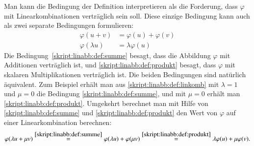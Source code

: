 Man kann die Bedingung der Definition interpretieren als die Forderung,
dass $\varphi$ mit Linearkombinationen verträglich sein soll.
Diese einzige Bedingung kann auch als zwei separate Bedingungen
formulieren:
\begin{align}
\varphi(u+v)&=\varphi(u)+\varphi(v)
\label{skript:linabb:def:summe}
\\
\varphi(\lambda u)&=\lambda \varphi(u)
\label{skript:linabb:def:produkt}
\end{align}
Die Bedingung~\eqref{skript:linabb:def:summe} besagt, dass die Abbildung
$\varphi$ mit Additionen verträglich ist, und 
\eqref{skript:linabb:def:produkt} besagt, dass $\varphi$ mit skalaren
Multiplikationen verträglich ist.
Die beiden Bedingungen sind natürlich äquivalent.
Zum Beispiel erhält man aus \eqref{skript:linabb:def:linkomb}
mit $\lambda=1$ und $\mu=0$ die Bedingung \eqref{skript:linabb:def:summe},
und mit $\mu =0$ erhält man
\eqref{skript:linabb:def:produkt}.
Umgekehrt berechnet man mit Hilfe von
\eqref{skript:linabb:def:summe}
und
\eqref{skript:linabb:def:produkt}
den Wert von $\varphi$ auf einer Linearkombination berechnen:
\[
\varphi(\lambda u + \mu v)
\overset{\eqref{skript:linabb:def:summe}}{=}
\varphi(\lambda u) + \varphi(\mu v)
\overset{\eqref{skript:linabb:def:produkt}}{=}
\lambda \varphi( u) + \mu \varphi( v).
\]








